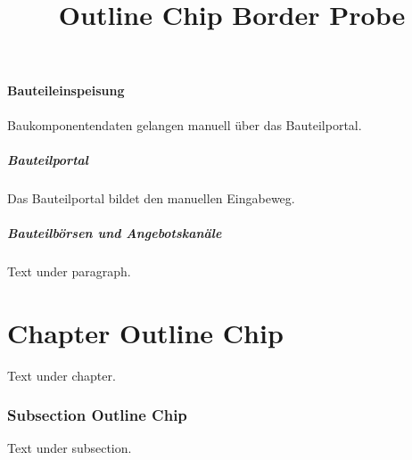 \documentclass[type=report,theme=light,language=de]{semio}
\title{Outline Chip Border Probe}
\begin{document}
\maketitle
\subsubsection{Bauteileinspeisung}
Baukomponentendaten gelangen manuell über das Bauteilportal.
\paragraph{Bauteilportal}
Das Bauteilportal bildet den manuellen Eingabeweg.
\paragraph{Bauteilbörsen und Angebotskanäle}
Text under paragraph.
\chapter{Chapter Outline Chip}
Text under chapter.
\subsection{Subsection Outline Chip}
Text under subsection.
\end{document}
